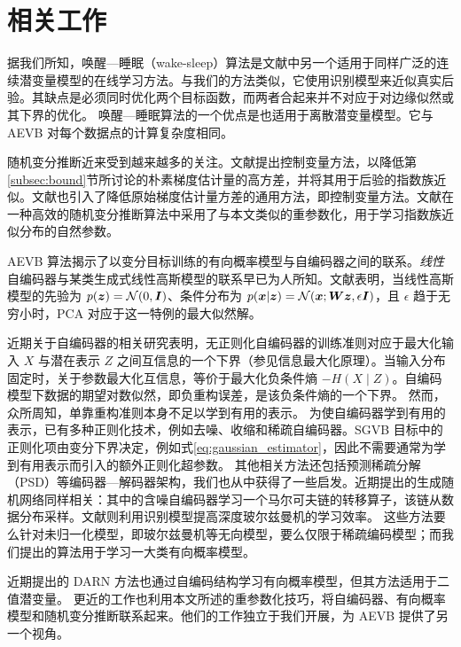 \section{相关工作}
据我们所知，唤醒—睡眠（wake-sleep）算法\cite{hinton1995wake}是文献中另一个适用于同样广泛的连续潜变量模型的在线学习方法。与我们的方法类似，它使用识别模型来近似真实后验。其缺点是必须同时优化两个目标函数，而两者合起来并不对应于对边缘似然或其下界的优化。
唤醒—睡眠算法的一个优点是也适用于离散潜变量模型。它与 AEVB 对每个数据点的计算复杂度相同。

随机变分推断\cite{hoffman2013stochastic}近来受到越来越多的关注。文献\cite{blei2012variational}提出控制变量方法，以降低第\ref{subsec:bound}节所讨论的朴素梯度估计量的高方差，并将其用于后验的指数族近似。文献\cite{ranganath2013black}也引入了降低原始梯度估计量方差的通用方法，即控制变量方法。文献\cite{salimans2013fixedform}在一种高效的随机变分推断算法中采用了与本文类似的重参数化，用于学习指数族近似分布的自然参数。



AEVB 算法揭示了以变分目标训练的有向概率模型与自编码器之间的联系。\emph{线性}自编码器与某类生成式线性高斯模型的联系早已为人所知。文献\cite{roweis1998algorithms}表明，当线性高斯模型的先验为 $p(\bm{z})=\mathcal{N}(0,\bm{I})$、条件分布为 $p(\bm{x}|\bm{z})=\mathcal{N}(\bm{x};\bm{W}\bm{z},\epsilon\bm{I})$，且 $\epsilon$ 趋于无穷小时，PCA 对应于这一特例的最大似然解。

近期关于自编码器的相关研究\cite{vincent2010stacked}表明，无正则化自编码器的训练准则对应于最大化输入 $X$ 与潜在表示 $Z$ 之间互信息的一个下界（参见信息最大化原理\cite{linsker1989application}）。当输入分布固定时，关于参数最大化互信息，等价于最大化负条件熵 $-H(X\mid Z)$。自编码模型下数据的期望对数似然，即负重构误差，是该负条件熵的一个下界\cite{vincent2010stacked}。
然而，众所周知，单靠重构准则本身不足以学到有用的表示\cite{bengio2013representation}。
为使自编码器学到有用的表示，已有多种正则化技术，例如去噪、收缩和稀疏自编码器\cite{bengio2013representation}。SGVB 目标中的正则化项由变分下界决定，例如式\eqref{eq:gaussian_estimator}，因此不需要通常为学到有用表示而引入的额外正则化超参数。
其他相关方法还包括预测稀疏分解（PSD）\cite{koray-psd-08}等编码器—解码器架构，我们也从中获得了一些启发。近期提出的生成随机网络\cite{bengio2013deep}同样相关：其中的含噪自编码器学习一个马尔可夫链的转移算子，该链从数据分布采样。文献\cite{salakhutdinov2010efficient}则利用识别模型提高深度玻尔兹曼机的学习效率。
这些方法要么针对未归一化模型，即玻尔兹曼机等无向模型，要么仅限于稀疏编码模型；而我们提出的算法用于学习一大类有向概率模型。

近期提出的 DARN 方法\cite{gregor2013deep}也通过自编码结构学习有向概率模型，但其方法适用于二值潜变量。
更近的工作\cite{rezende2014stochastic}也利用本文所述的重参数化技巧，将自编码器、有向概率模型和随机变分推断联系起来。他们的工作独立于我们开展，为 AEVB 提供了另一个视角。





